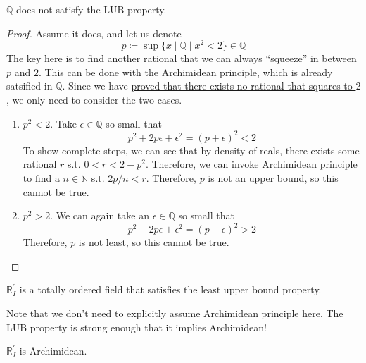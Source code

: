   \begin{theorem}
    $\mathbb{Q}$ does not satisfy the LUB property. 
  \end{theorem}
  \begin{proof}
    Assume it does, and let us denote 
    \begin{equation}
      p \coloneqq \sup \{x \mid \mathbb{Q} \mid x^2 < 2\} \in \mathbb{Q}
    \end{equation}
    The key here is to find another rational that we can always ``squeeze'' in between $p$ and $2$. This can be done with the Archimidean principle, which is already satsified in $\mathbb{Q}$. Since we have \href{thm:sqrt2-irrational}{proved that there exists no rational that squares to $2$}, we only need to consider the two cases. 
    \begin{enumerate}
      \item $p^2 < 2$. Take $\epsilon \in \mathbb{Q}$ so small that 
      \begin{equation}
        p^2 + 2 p \epsilon + \epsilon^2 = (p + \epsilon)^2 < 2
      \end{equation}
      To show complete steps, we can see that by density of reals, there exists some rational $r$ s.t. $0 < r < 2 - p^2$. Therefore, we can invoke Archimidean principle to find a $n \in \mathbb{N}$ s.t. $2 p/n < r$. Therefore, $p$ is not an upper bound, so this cannot be true. 

      \item $p^2 > 2$. We can again take an $\epsilon \in \mathbb{Q}$ so small that 
      \begin{equation}
        p^2 - 2 p \epsilon + \epsilon^2 = (p - \epsilon)^2 > 2
      \end{equation}
      Therefore, $p$ is not least, so this cannot be true. 
    \end{enumerate}
  \end{proof}

  \begin{definition}
    $\mathbb{R}_I^\prime$ is a totally ordered field that satisfies the least upper bound property.
  \end{definition}

  Note that we don't need to explicitly assume Archimidean principle here. The LUB property is strong enough that it implies Archimidean!

  \begin{theorem}
    $\mathbb{R}_I^\prime$ is Archimidean. 
  \end{theorem}

